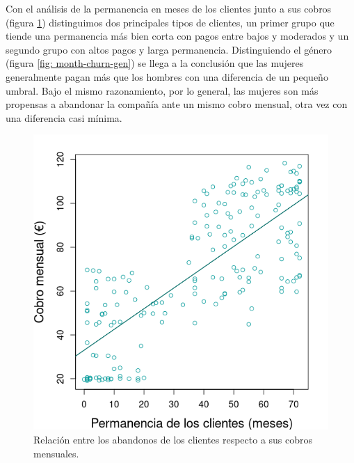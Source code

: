 \documentclass[10pt,a4paper]{article}
\begin{document}
Con el análisis de la permanencia en meses de los clientes junto a sus cobros (figura \ref{fig: month-churn}) distinguimos dos principales tipos de clientes, un primer grupo que tiende una permanencia más bien corta con pagos entre bajos y moderados y un segundo grupo con altos pagos y larga permanencia. Distinguiendo el género (figura \ref{fig: month-churn-gen}) se llega a la conclusión que las mujeres generalmente pagan más que los hombres con una diferencia de un pequeño umbral. Bajo el mismo razonamiento, por lo general, las mujeres son más propensas a abandonar la compañía ante un mismo cobro mensual, otra vez con una diferencia casi mínima.
\begin{figure}[!htb]
   \begin{minipage}{0.48\textwidth}
     \centering
     \includegraphics[width=\linewidth]{month-churn}
	 \caption{Relación entre los abandonos de los clientes respecto a sus cobros mensuales.}\label{fig: month-churn}
   \end{minipage}\hfill
   \begin{minipage}{0.48\textwidth}
     \centering

\end{minipage}
\end{figure}
\end{document}
